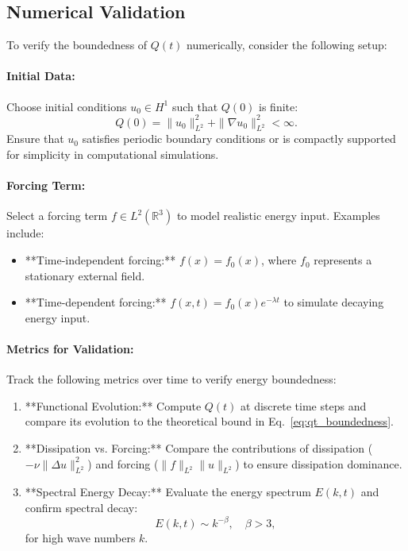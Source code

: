 \subsection{Numerical Validation}
To verify the boundedness of $Q(t)$ numerically, consider the following setup:

\paragraph{Initial Data:}
Choose initial conditions $u_0 \in H^1$ such that $Q(0)$ is finite:
\begin{equation}
Q(0) = \|u_0\|_{L^2}^2 + \|\nabla u_0\|_{L^2}^2 < \infty.
\end{equation}
Ensure that $u_0$ satisfies periodic boundary conditions or is compactly supported for simplicity in computational simulations.

\paragraph{Forcing Term:}
Select a forcing term $f \in L^2(\mathbb{R}^3)$ to model realistic energy input. Examples include:
\begin{itemize}
    \item **Time-independent forcing:** $f(x) = f_0(x)$, where $f_0$ represents a stationary external field.
    \item **Time-dependent forcing:** $f(x, t) = f_0(x) e^{-\lambda t}$ to simulate decaying energy input.
\end{itemize}

\paragraph{Metrics for Validation:}
Track the following metrics over time to verify energy boundedness:
\begin{enumerate}
    \item **Functional Evolution:** Compute $Q(t)$ at discrete time steps and compare its evolution to the theoretical bound in Eq.~\eqref{eq:qt_boundedness}.
    \item **Dissipation vs. Forcing:** Compare the contributions of dissipation ($-\nu \|\Delta u\|_{L^2}^2$) and forcing ($\|f\|_{L^2} \|u\|_{L^2}$) to ensure dissipation dominance.
    \item **Spectral Energy Decay:** Evaluate the energy spectrum $E(k, t)$ and confirm spectral decay:
    \begin{equation}
    E(k, t) \sim k^{-\beta}, \quad \beta > 3,
    \end{equation}
    for high wave numbers $k$.
\end{enumerate}


